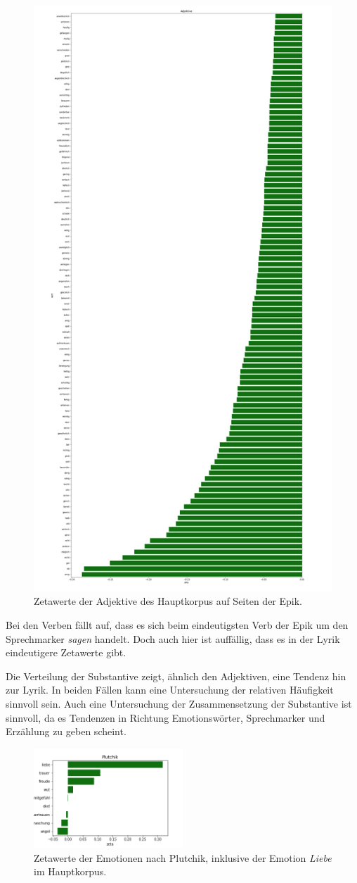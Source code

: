 \documentclass[a4paper,10p]{article}
\begin{document}
\begin{figure}{}
\begin{minipage}[b]{.45\linewidth}
        \includegraphics[width=.6\linewidth]{haupt_adjektive_pro_wort2.png}
        \caption{Zetawerte der Adjektive des Hauptkorpus  auf Seiten der Epik.}
        \label{haupt_adjektive2}
    \end{minipage}
\end{figure}


Bei den Verben fällt auf, dass es sich beim eindeutigsten Verb der Epik um den Sprechmarker \textit{sagen} handelt. Doch auch hier ist auffällig, dass es in der Lyrik eindeutigere Zetawerte gibt.  \par 

Die Verteilung der Substantive zeigt, ähnlich den Adjektiven, eine Tendenz hin zur Lyrik. In beiden Fällen kann eine Untersuchung der relativen Häufigkeit sinnvoll sein. Auch eine Untersuchung der Zusammensetzung der Substantive ist sinnvoll, da es Tendenzen in Richtung Emotionswörter, Sprechmarker und Erzählung zu geben scheint.\par 

\begin{figure}
	\includegraphics[width=0.5\textwidth]{hauptkorpus_prowort_plutchik_kleiner.png}
	\caption{Zetawerte der Emotionen nach Plutchik, inklusive der Emotion \textit{Liebe} im Hauptkorpus.}
	\label{fig:haupt_plutchik}
\end{figure}
\end{document}
